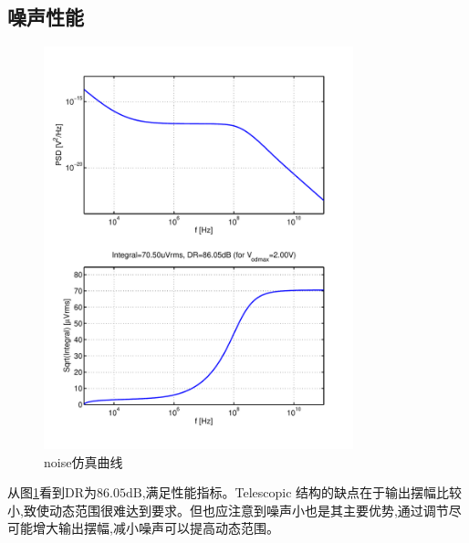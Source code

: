 \documentclass[a4paper]{article}
\newcommand{\udB}{\si{\deci\bel}}
\begin{document}
\subsection{噪声性能}

\begin{figure}[htb]
    \begin{center}
        \includegraphics[width=0.8\textwidth]{common/noise.pdf}
    \end{center}
    \caption{noise仿真曲线}
    \label{commonnoise}
\end{figure}
从图\ref{commonnoise}看到DR为$86.05\udB$,满足性能指标。Telescopic 结构的缺点在于输出摆幅比较小,致使动态范围很难达到要求。但也应注意到噪声小也是其主要优势,通过调节尽可能增大输出摆幅,减小噪声可以提高动态范围。
\newpage
\clearpage
\end{document}
